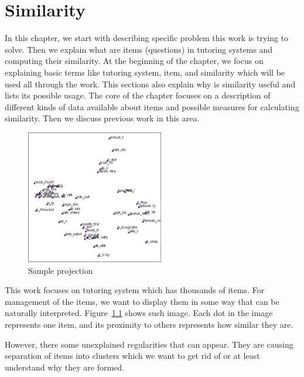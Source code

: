 \documentclass[
  printed, %
  table,   %
  nolof,     %
  nolot,     %
  color,
  final,
  nocover
]{fithesis3}
\begin{document}

\chapter{Similarity}


In this chapter, we start with describing specific problem this work is trying to solve. Then we explain what are items (questions) in tutoring systems and computing their similarity. At the beginning of the chapter, we focus on explaining basic terms like tutoring system, item, and similarity which will be used all through the work. This sections also explain why is similarity useful and lists its possible usage.  The core of the chapter focuses on a description of different kinds of data available about items and possible measures for calculating similarity. Then we discuss previous work in this area.


\begin{figure}
    \includegraphics[width=6cm]{img/sample_projection}
  \caption{Sample projection}
  \label{fig:sample_projection}
\end{figure}

This work focuses on tutoring system \umimeCesky{} which has thousands of items. For management of the items, we want to display them in some way that can be naturally interpreted. Figure~\ref{fig:sample_projection} shows such image. Each dot in the image represents one item, and its proximity to others represents how similar they are.

However, there some unexplained regularities that can appear. They are causing separation of items into clusters which we want to get rid of or at least understand why they are formed.

\end{document}
